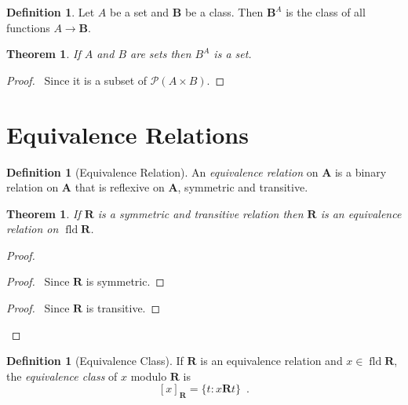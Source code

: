 \documentclass{report}
\let\qed\relax
\newtheorem{theorem}[axiom]{Theorem}
\theoremstyle{definition}
\newtheorem{definition}[axiom]{Definition}
\newcommand{\fld}{\ensuremath{\operatorname{fld}}}
\begin{document}
    \begin{definition}
        Let $A$ be a set and $\mathbf{B}$ be a class. Then $\mathbf{B}^A$ is the class of all functions
        $A \rightarrow \mathbf{B}$.
    \end{definition}

    \begin{theorem}
        If $A$ and $B$ are sets then $B^A$ is a set.
    \end{theorem}

    \begin{proof}
        \pf\ Since it is a subset of $\mathcal{P}(A \times B)$. \qed
    \end{proof}


    \section{Equivalence Relations}

    \begin{definition}[Equivalence Relation]
        An \emph{equivalence relation} on $\mathbf{A}$ is a binary relation on $\mathbf{A}$
        that is reflexive on $\mathbf{A}$, symmetric and transitive.
    \end{definition}

    \begin{theorem}
        If $\mathbf{R}$ is a symmetric and transitive relation then $\mathbf{R}$ is an equivalence relation
        on $\fld \mathbf{R}$.
    \end{theorem}

    \begin{proof}
        \pf
        \step{1}{\pflet{$x \in \fld \mathbf{R}$}}
        \begin{proof}
            \pf\ Since $\mathbf{R}$ is symmetric.
        \end{proof}
        \begin{proof}
            \pf\ Since $\mathbf{R}$ is transitive.
        \end{proof}
        \qed
    \end{proof}

    \begin{definition}[Equivalence Class]
        If $\mathbf{R}$ is an equivalence relation and $x \in \fld \mathbf{R}$, the \emph{equivalence class}
        of $x$ modulo $\mathbf{R}$ is
        \[ [x]_{\mathbf{R}} = \{ t : x \mathbf{R} t \} \enspace . \]
    \end{definition}
\end{document}
